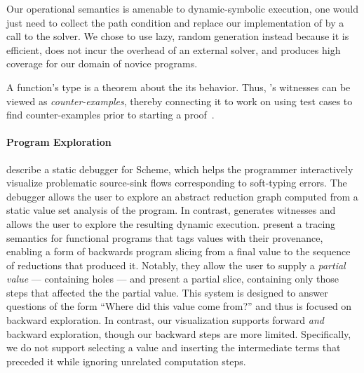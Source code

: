 Our operational semantics is amenable to dynamic-symbolic execution, one
would just need to collect the path condition and replace our
implementation of \gensym by a call to the solver. We chose to use lazy,
random generation instead because it is efficient, does not incur
the overhead of an external solver, and produces high coverage for our
domain of novice programs.

A function's type is a theorem about the its behavior.
Thus, \toolname's witnesses can be viewed as \emph{counter-examples},
thereby connecting it to work on using test cases to find
counter-examples prior to starting a proof~\cite{Chamarthi2011-fo,Seidel2015-pe}.


\paragraph{Program Exploration}

\citet{Flanagan1996-bu} describe a static debugger for Scheme, which helps
the programmer interactively visualize problematic source-sink flows
corresponding to soft-typing errors. The debugger allows the user to explore
an abstract reduction graph computed from a static value set analysis of
the program. In contrast, \toolname generates witnesses and allows the user
to explore the resulting dynamic execution.
%
\citet{Perera2012-dy} present a tracing semantics for functional
programs that tags values with their provenance, enabling a form of
backwards program slicing from a final value to the sequence of
reductions that produced it. Notably, they allow the user to supply a
\emph{partial value} --- containing holes --- and present a partial
slice, containing only those steps that affected the the partial value.
This system is designed to answer questions of the form ``Where did this
value come from?'' and thus is focused on backward exploration.
In contrast, our visualization supports forward \emph{and} backward
exploration, though our backward steps are more limited.
%
Specifically, we do not support selecting a value and inserting the
intermediate terms that preceded it while ignoring unrelated computation
steps. %


